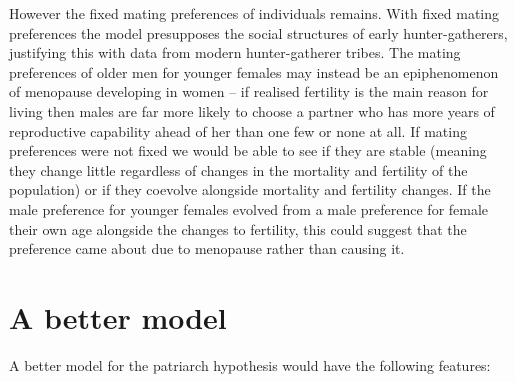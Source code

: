 \documentclass[authoryearcitations]{UoYCSproject}
\begin{document}
However the fixed mating preferences of individuals remains. With fixed mating preferences the model presupposes the social structures of early hunter-gatherers, justifying this with data from modern hunter-gatherer tribes. The mating preferences of older men for younger females may instead be an epiphenomenon of menopause developing in women -- if realised fertility is the main reason for living then males are far more likely to choose a partner who has more years of reproductive capability ahead of her than one few or none at all. If mating preferences were not fixed we would be able to see if they are stable (meaning they change little regardless of changes in the mortality and fertility of the population) or if they coevolve alongside mortality and fertility changes. If the male preference for younger females evolved from a male preference for female their own age alongside the changes to fertility, this could suggest that the preference came about due to menopause rather than causing it.

\section{A better model}
A better model for the patriarch hypothesis would have the following features:
\end{document}
